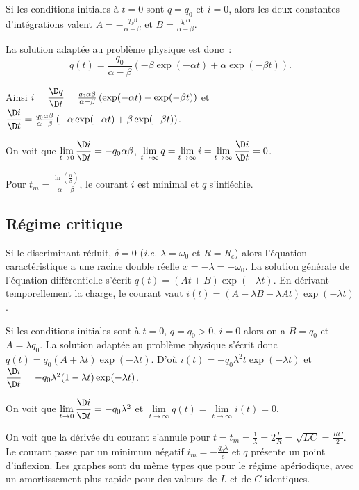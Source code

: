 Si les conditions initiales à $t=0$ sont $q=q_0$ et $i=0$, alors les deux constantes d'intégrations valent $A = -\frac{q_0 \beta}{\alpha - \beta}$ et $B = \frac{q_0 \alpha}{\alpha - \beta}$.

La solution adaptée au problème physique est donc~:
\begin{equation}
q(t) = \frac{q_0}{\alpha - \beta}\left(-\beta\exp(-\alpha t) + \alpha\exp(-\beta t )\right).
\end{equation}

Ainsi $i = \derived{q}{t} = \frac{q_0 \alpha \beta}{\alpha - \beta}\left(\exp(-\alpha t) - \exp(-\beta t )\right)$ et $\derived{i}{t} = \frac{q_0 \alpha \beta}{\alpha - \beta}\left(-\alpha\exp(-\alpha t) +\beta\exp(-\beta t )\right)$.

On voit que $\lim\limits_{t \to 0} \derived{i}{t} = -q_0 \alpha\beta$, $\lim\limits_{t \to \infty} q = \lim\limits_{t \to \infty} i = \lim\limits_{t \to \infty} \derived{i}{t} = 0$.

Pour $t_m = \frac{\ln\left(\frac{\alpha}{\beta}\right)}{\alpha-\beta}$, le courant $i$ est minimal et $q$ s'infléchie. %

\subsection{Régime critique}

Si le discriminant réduit, $\delta = 0$ (\emph{i.e.} $\lambda = \omega_0$ et $R = R_c$) alors l'équation caractéristique a une racine double réelle $x = -\lambda = -\omega_0$. La solution générale de l'équation différentielle s'écrit $q(t) = (At+B)\exp(-\lambda t)$. En dérivant temporellement la charge, le courant vaut $i(t) = (A-\lambda B-\lambda A t)\exp(-\lambda t)$. 

Si les conditions initiales sont à $t=0$, $q=q_0>0$, $i=0$ alors on a $B=q_0$ et $A=\lambda q_0$. La solution adaptée au problème physique s'écrit donc $q(t) = q_0(A+\lambda t)\exp(-\lambda t)$.
D'où $i(t) = -q_0\lambda^2 t\exp(-\lambda t)$ et $\derived{i}{t} = -q_0\lambda^2(1-\lambda t)\exp(-\lambda t)$.

On voit que $\lim\limits_{t \to 0} \derived{i}{t} = -q_0\lambda^2$ et $\lim\limits_{t \to \infty} q(t) = \lim\limits_{t \to \infty} i(t) = 0$.

On voit que la dérivée du courant s'annule pour $t=t_m = \frac{1}{\lambda} = 2\frac{L}{R} = \sqrt{LC} = \frac{RC}{2}$. Le courant passe par un minimum négatif $i_m=-\frac{q_0 \lambda}{e}$ et $q$ présente un point d'inflexion. Les graphes sont du même types que pour le régime apériodique, avec un amortissement plus rapide pour des valeurs de $L$ et de $C$ identiques.

